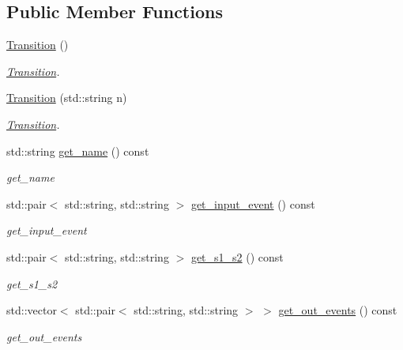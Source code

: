 \subsection*{Public Member Functions}
\begin{DoxyCompactItemize}
\item 
\hyperlink{class_transition_a73b44b2338b11807f77b620a3e810f92}{Transition} ()\hypertarget{class_transition_a73b44b2338b11807f77b620a3e810f92}{}\label{class_transition_a73b44b2338b11807f77b620a3e810f92}

\begin{DoxyCompactList}\small\item\em \hyperlink{class_transition}{Transition}. \end{DoxyCompactList}\item 
\hyperlink{class_transition_a2455a9d73049ae0fe4edba67be1cb62d}{Transition} (std\+::string n)
\begin{DoxyCompactList}\small\item\em \hyperlink{class_transition}{Transition}. \end{DoxyCompactList}\item 
std\+::string \hyperlink{class_transition_afb2e105b100da66587695033bf45ed0e}{get\+\_\+name} () const 
\begin{DoxyCompactList}\small\item\em get\+\_\+name \end{DoxyCompactList}\item 
std\+::pair$<$ std\+::string, std\+::string $>$ \hyperlink{class_transition_aa9a28517d94919fccfb147c8a0ad4dc0}{get\+\_\+input\+\_\+event} () const 
\begin{DoxyCompactList}\small\item\em get\+\_\+input\+\_\+event \end{DoxyCompactList}\item 
std\+::pair$<$ std\+::string, std\+::string $>$ \hyperlink{class_transition_a173debd0cd54c3a87ecdfba9ab761f80}{get\+\_\+s1\+\_\+s2} () const 
\begin{DoxyCompactList}\small\item\em get\+\_\+s1\+\_\+s2 \end{DoxyCompactList}\item 
std\+::vector$<$ std\+::pair$<$ std\+::string, std\+::string $>$ $>$ \hyperlink{class_transition_ade549af354654b844af6d54693f4af6a}{get\+\_\+out\+\_\+events} () const 
\begin{DoxyCompactList}\small\item\em get\+\_\+out\+\_\+events \end{DoxyCompactList}\item 

\end{DoxyCompactItemize}
